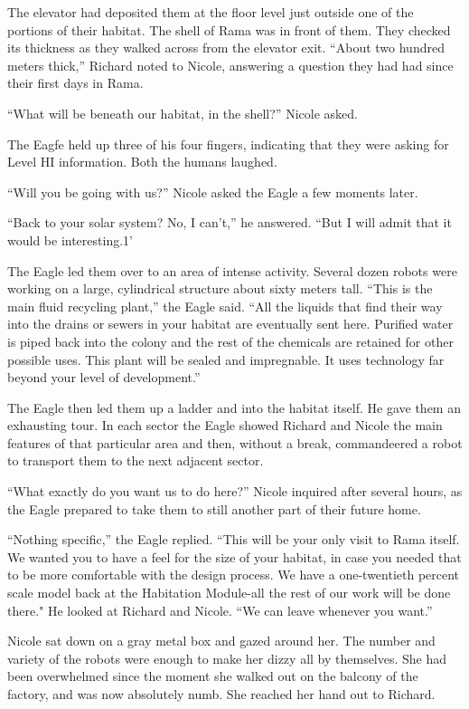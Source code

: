 \documentclass[]{article}
\begin{document}
{The elevator had deposited them at the floor level just outside one of the portions of their habitat.  The shell of Rama was in front of them.  They checked its thickness as they walked across from the elevator exit.  “About two hundred meters thick,” Richard noted to Nicole, answering a question they had had since their first days in Rama.

“What will be beneath our habitat, in the shell?” Nicole asked.

The Eagfe held up three of his four fingers, indicating that they were asking for Level HI information.  Both the humans laughed.

“Will you be going with us?” Nicole asked the Eagle a few moments later.

“Back to your solar system? No, I can’t,” he answered.  “But I will admit that it would be interesting.1’

The Eagle led them over to an area of intense activity.  Several dozen robots were working on a large, cylindrical structure about sixty meters tall.  “This is the main fluid recycling plant,” the Eagle said.  “All the liquids that find their way into the drains or sewers in your habitat are eventually sent here.  Purified water is piped back into the colony and the rest of the chemicals are retained for other possible uses.  This plant will be sealed and impregnable.  It uses technology far beyond your level of development.”

The Eagle then led them up a ladder and into the habitat itself.  He gave them an exhausting tour.  In each sector the Eagle showed Richard and Nicole the main features of that particular area and then, without a break, commandeered a robot to transport them to the next adjacent sector.

“What exactly do you want us to do here?” Nicole inquired after several hours, as the Eagle prepared to take them to still another part of their future home.

“Nothing specific,” the Eagle replied.  “This will be your only visit to Rama itself.  We wanted you to have a feel for the size of your habitat, in case you needed that to be more comfortable with the design process.  We have a one-twentieth percent scale model back at the Habitation Module-all the rest of our work will be done there."  He looked at Richard and Nicole.  “We can leave whenever you want.”

Nicole sat down on a gray metal box and gazed around her.  The number and variety of the robots were enough to make her dizzy all by themselves.  She had been overwhelmed since the moment she walked out on the balcony of the factory, and was now absolutely numb.  She reached her hand out to Richard.

}
\end{document}
